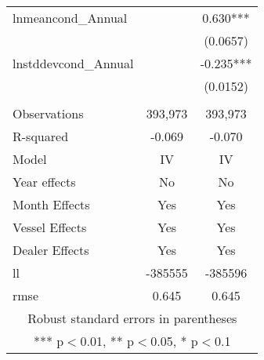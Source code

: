 \begin{tabular}{lcc}
lnmeancond\_Annual &  & 0.630*** \\
 &  & (0.0657) \\
lnstddevcond\_Annual &  & -0.235*** \\
 &  & (0.0152) \\
 &  &  \\
Observations & 393,973 & 393,973 \\
R-squared & -0.069 & -0.070 \\
Model & IV & IV \\
Year effects & No & No \\
Month Effects & Yes & Yes \\
Vessel Effects & Yes & Yes \\
Dealer Effects & Yes & Yes \\
ll & -385555 & -385596 \\
 rmse & 0.645 & 0.645 \\ \hline
\multicolumn{3}{c}{ Robust standard errors in parentheses} \\
\multicolumn{3}{c}{ *** p$<$0.01, ** p$<$0.05, * p$<$0.1} \\
\end{tabular}
